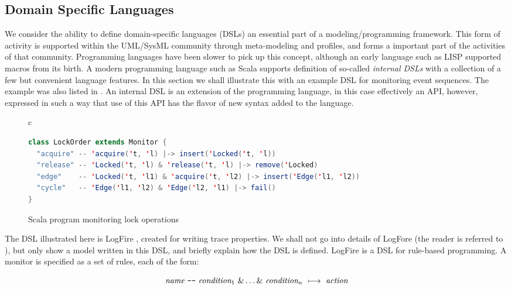 \subsection{Domain Specific Languages}
\label{sec:dsl-in-scala}

We consider the ability to define domain-specific languages (DSLs) an 
essential part of a modeling/programming framework. This form of activity is supported 
within the UML/SysML community through meta-modeling and profiles, and forms
a important part of the activities of that community. Programming languages have been
slower to pick up this concept, although an early language such as LISP supported macros
from its birth. A modern programming language such as Scala supports definition of
so-called {\em internal DSLs} with a collection of a few but convenient 
language features. In this section we shall illustrate this with an example
DSL for monitoring event sequences. The example was also listed in \cite{?}.
An internal DSL is an extension of the programming language, in this case 
effectively an API, however, expressed in such a way that use of this API
has the flavor of new syntax added to the language.

\begin{figure}
\begin{center}
\begin{tabular}{c}
\begin{lstlisting}[language=scala]
class LockOrder extends Monitor { 
  "acquire" -- 'acquire('t, 'l) |-> insert('Locked('t, 'l))
  "release" -- 'Locked('t, 'l) & 'release('t, 'l) |-> remove('Locked)
  "edge"    -- 'Locked('t, 'l1) & 'acquire('t, 'l2) |-> insert('Edge('l1, 'l2))
  "cycle"   -- 'Edge('l1, 'l2) & 'Edge('l2, 'l1) |-> fail() 
}
\end{lstlisting}
\end{tabular}
\end{center}
\caption{Scala program monitoring lock operations}
\label{fig:deadlocks-scala}
\end{figure}

The DSL illustrated here is LogFire \cite{havelund-logfire-sttt14},
created for writing trace properties. We shall not go into details
of LogFore (the reader is referred to \cite{havelund-logfire-sttt14}),
but only show a model written in this DSL, and briefly explain how the
DSL is defined. LogFire is a DSL for rule-based programming. A monitor is specified as 
a set of rules, each of the form: 

\[
  \textit{name}\ \verb+--+\ \textit{condition}_1\ \& \ldots \&\ \textit{condition}_n\ \longmapsto\  \textit{action}
\]

